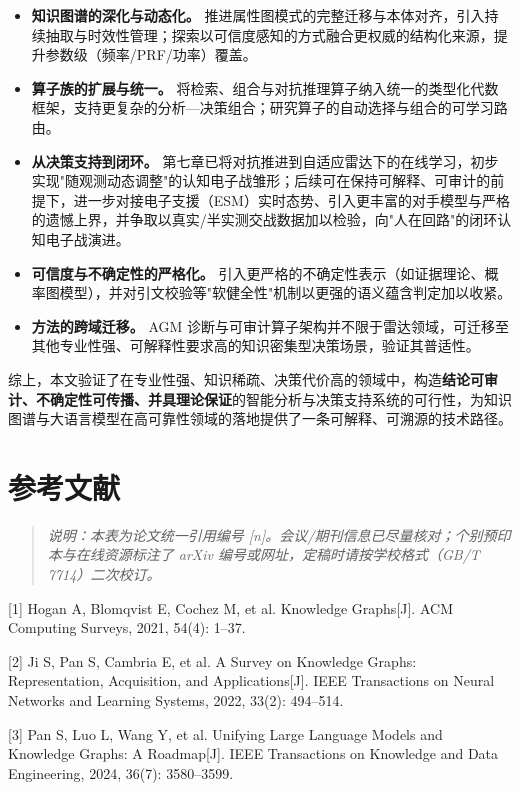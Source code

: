 \documentclass[12pt,a4paper]{ctexart}
\begin{document}
\begin{itemize}[leftmargin=2em]
\item \textbf{知识图谱的深化与动态化。} 推进属性图模式的完整迁移与本体对齐，引入持续抽取与时效性管理；探索以可信度感知的方式融合更权威的结构化来源，提升参数级（频率/PRF/功率）覆盖。
\item \textbf{算子族的扩展与统一。} 将检索、组合与对抗推理算子纳入统一的类型化代数框架，支持更复杂的分析—决策组合；研究算子的自动选择与组合的可学习路由。
\item \textbf{从决策支持到闭环。} 第七章已将对抗推进到自适应雷达下的在线学习，初步实现"随观测动态调整"的认知电子战雏形；后续可在保持可解释、可审计的前提下，进一步对接电子支援（ESM）实时态势、引入更丰富的对手模型与严格的遗憾上界，并争取以真实/半实测交战数据加以检验，向"人在回路"的闭环认知电子战演进。
\item \textbf{可信度与不确定性的严格化。} 引入更严格的不确定性表示（如证据理论、概率图模型），并对引文校验等"软健全性"机制以更强的语义蕴含判定加以收紧。
\item \textbf{方法的跨域迁移。} AGM 诊断与可审计算子架构并不限于雷达领域，可迁移至其他专业性强、可解释性要求高的知识密集型决策场景，验证其普适性。
\end{itemize}

综上，本文验证了在专业性强、知识稀疏、决策代价高的领域中，构造\textbf{结论可审计、不确定性可传播、并具理论保证}的智能分析与决策支持系统的可行性，为知识图谱与大语言模型在高可靠性领域的落地提供了一条可解释、可溯源的技术路径。



\section*{参考文献}

\begin{quote}\itshape 说明：本表为论文统一引用编号 [n]。会议/期刊信息已尽量核对；个别预印本与在线资源标注了 arXiv 编号或网址，定稿时请按学校格式（GB/T 7714）二次校订。\end{quote}

[1] Hogan A, Blomqvist E, Cochez M, et al. Knowledge Graphs[J]. ACM Computing Surveys, 2021, 54(4): 1–37.

[2] Ji S, Pan S, Cambria E, et al. A Survey on Knowledge Graphs: Representation, Acquisition, and Applications[J]. IEEE Transactions on Neural Networks and Learning Systems, 2022, 33(2): 494–514.

[3] Pan S, Luo L, Wang Y, et al. Unifying Large Language Models and Knowledge Graphs: A Roadmap[J]. IEEE Transactions on Knowledge and Data Engineering, 2024, 36(7): 3580–3599.
\end{document}
